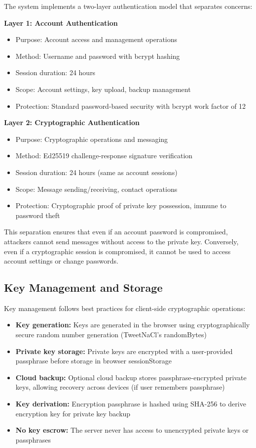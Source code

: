 \documentclass[12pt,a4paper,openany]{book}
\begin{document}
The system implements a two-layer authentication model that separates concerns:

\textbf{Layer 1: Account Authentication}
\begin{itemize}
\item Purpose: Account access and management operations
\item Method: Username and password with bcrypt hashing
\item Session duration: 24 hours
\item Scope: Account settings, key upload, backup management
\item Protection: Standard password-based security with bcrypt work factor of 12
\end{itemize}

\textbf{Layer 2: Cryptographic Authentication}
\begin{itemize}
\item Purpose: Cryptographic operations and messaging
\item Method: Ed25519 challenge-response signature verification
\item Session duration: 24 hours (same as account sessions)
\item Scope: Message sending/receiving, contact operations
\item Protection: Cryptographic proof of private key possession, immune to password theft
\end{itemize}

This separation ensures that even if an account password is compromised, attackers cannot send messages without access to the private key. Conversely, even if a cryptographic session is compromised, it cannot be used to access account settings or change passwords.

\subsection{Key Management and Storage}

Key management follows best practices for client-side cryptographic operations:

\begin{itemize}
\item \textbf{Key generation:} Keys are generated in the browser using cryptographically secure random number generation (TweetNaCl's randomBytes)
\item \textbf{Private key storage:} Private keys are encrypted with a user-provided passphrase before storage in browser sessionStorage
\item \textbf{Cloud backup:} Optional cloud backup stores passphrase-encrypted private keys, allowing recovery across devices (if user remembers passphrase)
\item \textbf{Key derivation:} Encryption passphrase is hashed using SHA-256 to derive encryption key for private key backup
\item \textbf{No key escrow:} The server never has access to unencrypted private keys or passphrases
\end{itemize}
\end{document}
